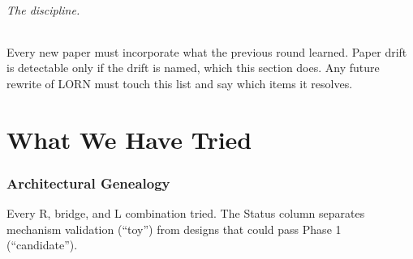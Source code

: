 \documentclass[10pt, twocolumn, a4paper]{article}
\begin{document}
\paragraph{The discipline.} Every new paper must incorporate what the previous round learned. Paper drift is detectable only if the drift is named, which this section does. Any future rewrite of LORN must touch this list and say which items it resolves.


\part{What We Have Tried}

\section{Architectural Genealogy}

Every R, bridge, and L combination tried. The Status column separates mechanism validation (``toy'') from designs that could pass Phase 1 (``candidate'').
\end{document}
